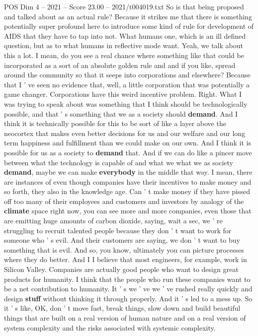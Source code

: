 \begin{textsample}{POS Dim 4 – 2021 – Score 23.00 – 2021/t004019.txt}
So is that being proposed and talked about as an actual rule?
Because it strikes me that there is something potentially super profound here to introduce some kind of rule for development of AIDS that they have to tap into not.
What humans one, which is an ill defined question, but as to what humans in reflective mode want.
Yeah, we talk about this a lot.
I mean, do you see a real chance where something like that could be incorporated as a sort of an absolute golden rule and and if you like, spread around the community so that it seeps into corporations and elsewhere?
Because that I ' ve seen no evidence that, well, a little corporation that was potentially a game changer.
Corporations have this weird incentive problem.
Right.
What I was trying to speak about was something that I think should be technologically possible, and that ' s something that we as a society should \textbf{demand}.
And I think it is technically possible for this to be sort of like a layer above the neocortex that makes even better decisions for us and our welfare and our long term happiness and fulfillment than we could make on our own.
And I think it is possible for us as a society to \textbf{demand} that.
And if we can do like a pincer move between what the technology is capable of and what we what we as society \textbf{demand}, maybe we can make \textbf{everybody} in the middle that way.
I mean, there are instances of even though companies have their incentives to make money and so forth, they also in the knowledge age.
Can ' t make money if they have pissed off too many of their employees and customers and investors by analogy of the \textbf{climate} space right now, you can see more and more companies, even those that are emitting huge amounts of carbon dioxide, saying, wait a sec, we ' re struggling to recruit talented people because they don ' t want to work for someone who ' s evil.
And their customers are saying, we don ' t want to buy something that is evil.
And so, you know, ultimately you can picture processes where they do better.
And I I believe that most engineers, for example, work in Silicon Valley.
Companies are actually good people who want to design great products for humanity.
I think that the people who run these companies want to be a net contribution to humanity.
It ' s we ' ve we ' ve rushed really quickly and design \textbf{stuff} without thinking it through properly.
And it ' s led to a mess up.
So it ' s like, OK, don ' t move fast, break things, slow down and build beautiful things that are built on a real version of human nature and on a real version of system complexity and the risks associated with systemic complexity.

\end{textsample}
